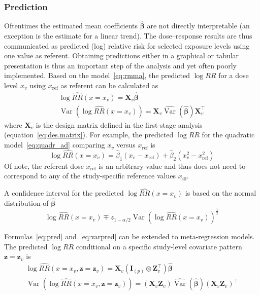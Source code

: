 \documentclass[11pt,a4paper,twoside,openany]{book}\usepackage{knitr}
\DeclareMathOperator{\Var}{Var}
\begin{document}
{\subsubsection*{Prediction}\label{sec:pred}

Oftentimes the estimated mean coefficients $\boldsymbol{\hat \beta}$ are not directly interpretable (an exception is the estimate for a linear trend). The dose--response results are thus communicated as predicted (log) relative risk for selected exposure levels using one value as referent. Obtaining predictions either in a graphical or tabular presentation is thus an important step of the analysis and yet often poorly implemented.
Based on the model~\ref{eq:rmma}, the predicted $\log RR$ for a dose level $x_v$ using $x_\mathrm{ref}$ as referent can be calculated as
\begin{align}
\log \widehat{RR}(x = x_v) = \mathbf{X}_v\boldsymbol{\hat \beta} \label{eq:pred} \\
\Var \left(\log \widehat{RR}(x = x_v) \right) = \mathbf{X}_v \widehat{\Var} \left( \boldsymbol{\hat \beta} \right) \mathbf{X}_v^\top \label{eq:varpred}
\end{align}
\noindent where $\mathbf{X}_v$ is the design matrix defined in the first-stage analysis (equation~\ref{eq:des.matrix}). For example, the predicted $\log RR$ for the quadratic model~\ref{eq:quadr_ad} comparing $x_v$ versus $x_\mathrm{ref}$ is
\begin{equation*}
\log \widehat{RR}(x = x_v) = \hat \beta_1 \left(x_v - x_\mathrm{ref} \right) + \hat \beta_2 \left(x_v^2 - x_\mathrm{ref}^2 \right)
\end{equation*}
Of note, the referent dose $x_\mathrm{ref}$ is an arbitrary value and thus does not need to correspond to any of the study-specific reference values $x_{i0}$.

\noindent A confidence interval for the predicted $\log \widehat{RR}(x = x_v)$ is based on the normal distribution of $\boldsymbol{\hat \beta}$
\begin{equation*}
\log \widehat{RR}(x = x_v) \mp z_{1- \alpha/2} \Var \left(\log \widehat{RR}(x = x_v) \right)^{\frac{1}{2}}
\label{eq:pred_ci}
\end{equation*}

\noindent Formulas~\ref{eq:pred} and~\ref{eq:varpred} can be extended to meta-regression models. The predicted $\log RR$ conditional on a specific study-level covariate pattern $\mathbf{z} = \mathbf{z}_v$ is
\begin{align}
\log \widehat{RR}\left(x = x_v, \mathbf{z} = \mathbf{z}_v  \right)= \mathbf{X}_v \left(\mathbf{I}_{(p)} \otimes \mathbf{Z}_v^\top \right) \boldsymbol{\hat \beta}  \label{eq:pred_mr} \\
\Var \left(\log \widehat{RR}\left(x = x_v, \mathbf{z}= \mathbf{z}_v \right) \right) = \left( \mathbf{X}_v \mathbf{Z}_v\right) \widehat{\Var} \left( \boldsymbol{\hat \beta} \right) \left( \mathbf{X}_v \mathbf{Z}_v\right)^\top \label{eq:varpred_mr}
\end{align}


}
\end{document}

